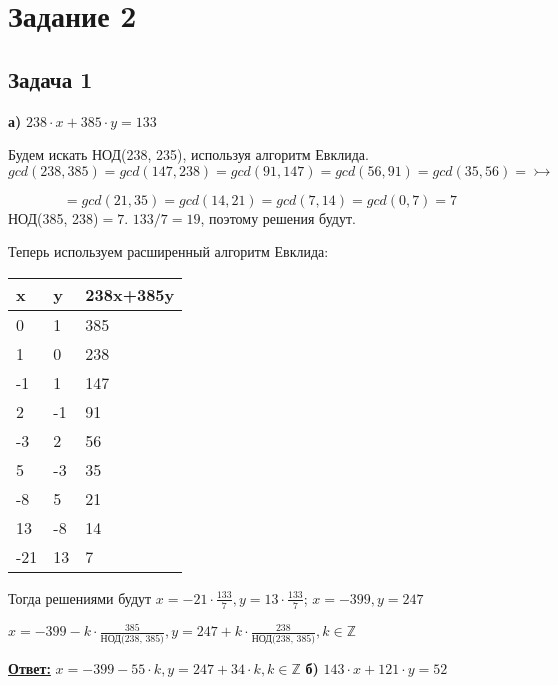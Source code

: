 \documentclass[a4paper,14pt]{article} %
\begin{document}

\section{Задание 2}

\subsection{Задача 1}
\textbf{а)} $238 \cdot x + 385 \cdot y = 133$

Будем искать НОД(238, 235), используя алгоритм Евклида.
\begin{equation*}
gcd(238, 385) = gcd(147, 238) = gcd(91, 147) = gcd(56, 91) = gcd(35, 56) = \rightarrowtail
\end{equation*}

\begin{equation*}
	= gcd(21, 35) = gcd(14, 21) = gcd(7, 14) = gcd(0, 7) = 7
\end{equation*}
НОД(385, 238)$ = 7$. $133 / 7 = 19$, поэтому решения будут.

Теперь используем расширенный алгоритм Евклида:

\begin{table}[H]
	\begin{tabular}{|l|l|l|}
	\hline
	x   & y  & 238x+385y \\ \hline
	0   & 1  & 385       \\ \hline
	1   & 0  & 238       \\ \hline
	-1  & 1  & 147       \\ \hline
	2   & -1 & 91        \\ \hline
	-3  & 2  & 56        \\ \hline
	5   & -3 & 35        \\ \hline
	-8  & 5  & 21        \\ \hline
	13  & -8 & 14        \\ \hline
	-21 & 13 & 7         \\ \hline
	\end{tabular}
\end{table}

Тогда решениями будут $x = -21 \cdot \frac{133}{7}, y = 13 \cdot \frac{133}{7}$; $x = -399, y = 247$


$x = -399 - k \cdot \frac{385}{\text{НОД(238, 385)}}, y = 247 + k \cdot \frac{238}{\text{НОД(238, 385)}}, k \in \mathds{Z}$


\underline{\textbf{Ответ:}} $x = -399 - 55 \cdot k, y = 247 + 34 \cdot k, k \in \mathds{Z}$
\newline
\textbf{б)} $143 \cdot x + 121 \cdot y = 52$
\end{document}
